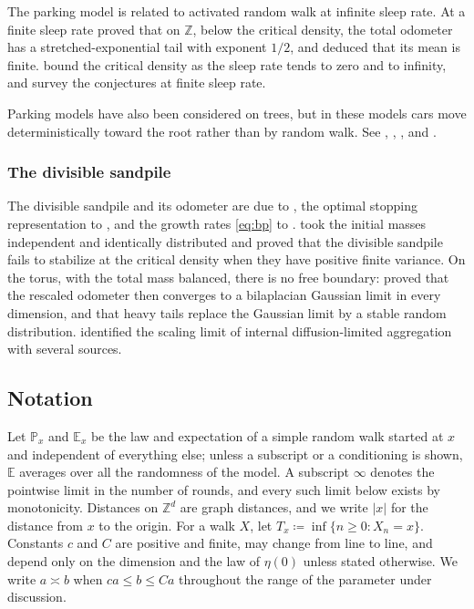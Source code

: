 \documentclass[11pt]{amsart}
\theoremstyle{plain}
\theoremstyle{definition}
\newcommand{\Z}{\mathbb{Z}}
\newcommand{\E}{\mathbb{E}}
\renewcommand{\P}{\mathbb{P}}
\begin{document}
The parking model is related to activated random walk at infinite sleep rate.
At a finite sleep rate \citet{JR} proved that on $\Z$, below the critical
density, the total odometer has a stretched-exponential tail with
exponent $1/2$, and deduced that its mean is finite. \citet{KM} bound the
critical density as the sleep rate tends to zero and to infinity, and
\citet{LS} survey the conjectures at finite sleep rate.

Parking models have also been considered on trees, but in these models cars
move deterministically toward the root rather than by random walk. See
\citet{GP}, \citet{CH}, \citet{Contat}, \citet{ACCH} and
\citet{BBJ}.

\subsubsection{The divisible sandpile}

The divisible sandpile and its odometer are due to \citet{LevinePeres09}, the
optimal stopping representation to \citet{BPRS}, and the growth rates
\eqref{eq:bp} to \citet{BP}. \citet{LMPU} took the initial
masses independent and identically distributed and proved that the divisible sandpile
fails to stabilize at the critical density when they have positive finite
variance. On the torus, with the total mass balanced, there is no free
boundary: \citet{CHR} proved that the rescaled odometer then converges to a
bilaplacian Gaussian limit in every dimension, and \citet{CHR2} that heavy tails
replace the Gaussian limit by a stable random distribution. \citet{LP10} identified the scaling limit
of internal diffusion-limited aggregation with several sources.

\subsection{Notation}\label{ssec:conventions}

Let $\P_x$ and $\E_x$ be the law and expectation of a simple random walk started
at $x$ and independent of everything else; unless a subscript or a conditioning
is shown, $\E$ averages over all the randomness of the model. A subscript
$\infty$ denotes the pointwise limit in the number of rounds, and every such
limit below exists by monotonicity. Distances on $\Z^d$ are graph distances,
and we write $|x|$ for the distance from $x$ to the origin. For a walk $X$, let
$T_x\coloneqq\inf\{n\geq0:X_n=x\}$. Constants $c$ and $C$ are
positive and finite, may change from line to line, and depend only on the
dimension and the law of $\eta(0)$ unless stated otherwise. We write
$a\asymp b$ when $ca\leq b\leq Ca$ throughout the range of the parameter under
discussion.
\end{document}
